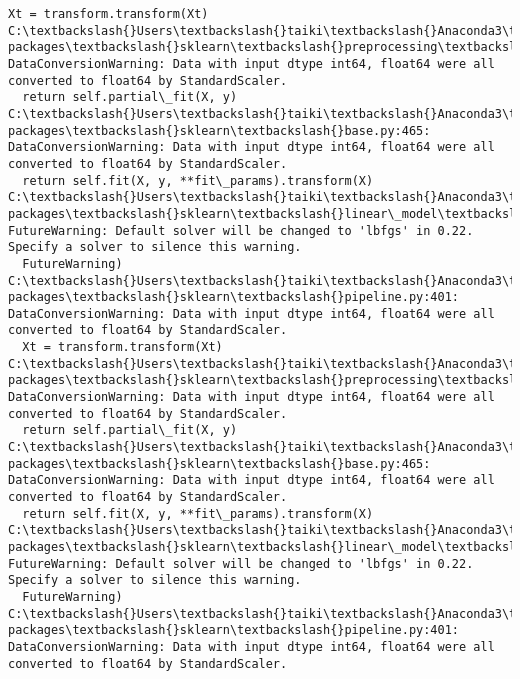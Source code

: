 \documentclass[a4j, dvipdfmx]{jsarticle}
\begin{document}
\begin{Verbatim}[commandchars=\\\{\}]
  Xt = transform.transform(Xt)
C:\textbackslash{}Users\textbackslash{}taiki\textbackslash{}Anaconda3\textbackslash{}Lib\textbackslash{}site-packages\textbackslash{}sklearn\textbackslash{}preprocessing\textbackslash{}data.py:625: DataConversionWarning: Data with input dtype int64, float64 were all converted to float64 by StandardScaler.
  return self.partial\_fit(X, y)
C:\textbackslash{}Users\textbackslash{}taiki\textbackslash{}Anaconda3\textbackslash{}Lib\textbackslash{}site-packages\textbackslash{}sklearn\textbackslash{}base.py:465: DataConversionWarning: Data with input dtype int64, float64 were all converted to float64 by StandardScaler.
  return self.fit(X, y, **fit\_params).transform(X)
C:\textbackslash{}Users\textbackslash{}taiki\textbackslash{}Anaconda3\textbackslash{}Lib\textbackslash{}site-packages\textbackslash{}sklearn\textbackslash{}linear\_model\textbackslash{}logistic.py:433: FutureWarning: Default solver will be changed to 'lbfgs' in 0.22. Specify a solver to silence this warning.
  FutureWarning)
C:\textbackslash{}Users\textbackslash{}taiki\textbackslash{}Anaconda3\textbackslash{}Lib\textbackslash{}site-packages\textbackslash{}sklearn\textbackslash{}pipeline.py:401: DataConversionWarning: Data with input dtype int64, float64 were all converted to float64 by StandardScaler.
  Xt = transform.transform(Xt)
C:\textbackslash{}Users\textbackslash{}taiki\textbackslash{}Anaconda3\textbackslash{}Lib\textbackslash{}site-packages\textbackslash{}sklearn\textbackslash{}preprocessing\textbackslash{}data.py:625: DataConversionWarning: Data with input dtype int64, float64 were all converted to float64 by StandardScaler.
  return self.partial\_fit(X, y)
C:\textbackslash{}Users\textbackslash{}taiki\textbackslash{}Anaconda3\textbackslash{}Lib\textbackslash{}site-packages\textbackslash{}sklearn\textbackslash{}base.py:465: DataConversionWarning: Data with input dtype int64, float64 were all converted to float64 by StandardScaler.
  return self.fit(X, y, **fit\_params).transform(X)
C:\textbackslash{}Users\textbackslash{}taiki\textbackslash{}Anaconda3\textbackslash{}Lib\textbackslash{}site-packages\textbackslash{}sklearn\textbackslash{}linear\_model\textbackslash{}logistic.py:433: FutureWarning: Default solver will be changed to 'lbfgs' in 0.22. Specify a solver to silence this warning.
  FutureWarning)
C:\textbackslash{}Users\textbackslash{}taiki\textbackslash{}Anaconda3\textbackslash{}Lib\textbackslash{}site-packages\textbackslash{}sklearn\textbackslash{}pipeline.py:401: DataConversionWarning: Data with input dtype int64, float64 were all converted to float64 by StandardScaler.

\end{Verbatim}
\end{document}
